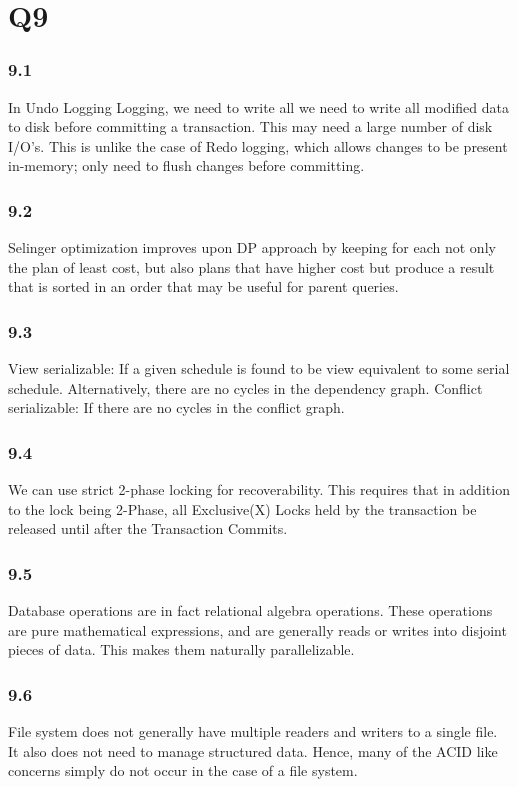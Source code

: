 \documentclass{article}
\begin{document}
\section{Q9}
\subsubsection{9.1}
In Undo Logging Logging, we need to write all we need to write all modified
data to disk before committing a transaction.  This may need a large number of disk
I/O’s. This is unlike the case of Redo logging, which allows changes to be
present in-memory; only need to flush changes before committing.

\subsubsection{9.2}
Selinger optimization improves upon DP approach by keeping for
each  not only the plan of least cost, but also plans that have higher
cost but produce a result that is sorted in an order that may
be useful for parent queries.
\subsubsection{9.3}

View serializable: If a given schedule is found to be view equivalent to some serial schedule. Alternatively,
  there are no cycles in the dependency graph.
Conflict serializable: If there are no cycles in the conflict graph.


\subsubsection{9.4}

We can use strict 2-phase locking for recoverability. This requires that
in addition to the lock being 2-Phase, all Exclusive(X) Locks held by the
transaction be released until after the Transaction Commits.

\subsubsection{9.5}
Database operations are in fact relational algebra operations. These
operations are pure mathematical expressions, and are generally reads or
writes into disjoint pieces of data. This makes them naturally parallelizable.


\subsubsection{9.6}
File system does not generally have multiple readers and writers to a single
file. It also does not need to manage structured data. Hence, many of the ACID
like concerns simply do not occur in the case of a file system.
\end{document}
